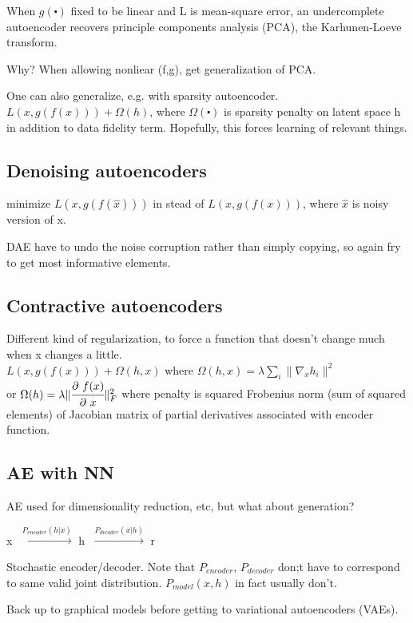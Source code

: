 \documentclass[12pt,a4paper]{article}
\begin{document}
When $g(\centerdot)$ fixed to be linear and L is mean-square error, an undercomplete autoencoder recovers principle components analysis (PCA), the Karhunen-Loeve transform. 

Why? When allowing nonliear (f,g), get generalization of PCA. 

One can also generalize, e.g. with sparsity autoencoder. \\
$L(x, g(f(x)))+\Omega(h)$, where $\Omega(\centerdot)$ is sparsity penalty on latent space h in addition to data fidelity term. Hopefully, this forces learning of relevant things. 

\subsection{Denoising autoencoders}
minimize $L(x, g(f(\hat{x})))$ in stead of $L(x, g(f(x)))$, where $\hat{x}$ is noisy version of x. 

DAE have to undo the noise corruption rather than simply copying, so again fry to get most informative elements. 

\subsection{Contractive autoencoders}
Different kind of regularization, to force a function that doesn't change much when x changes a little. \\
$L(x, g(f(x)))+\Omega(h, x)$ where $\Omega(h, x)=\lambda \sum_i\|\nabla_xh_i\|^2$\\ 
or $\Omega(h)=\lambda \|\cfrac{\partial\ f(x)}{\partial\ x}\|^2_F$ where penalty is squared Frobenius norm (sum of squared elements) of Jacobian matrix of partial derivatives associated with encoder function. 

\vspace{0.5cm}
\subsection{AE with NN}
AE used for dimensionality reduction, etc, but what about generation?

\textcircled{x} $\overset{P_{encoder}(h|x)}{\longrightarrow}$ \textcircled{h} $\overset{P_{decoder}(x|h)} {\longrightarrow}$ \textcircled{r}

Stochastic encoder/decoder. Note that $P_{encoder}$, $P_{decoder}$ don;t have to correspond to same valid joint distribution. $P_{model}(x,h)$ in fact usually don't. 

\vspace{0.5cm}
Back up to graphical models before getting to variational autoencoders (VAEs).
\end{document}
